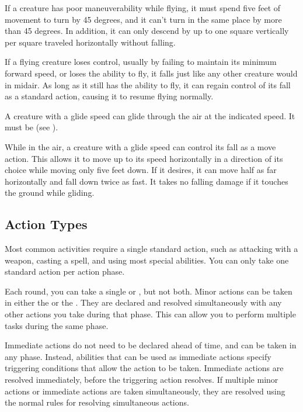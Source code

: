              If a creature has poor maneuverability while flying, it must spend five feet of movement to turn by 45 degrees, and it can't turn in the same place by more than 45 degrees. In addition, it can only descend by up to one square vertically per square traveled horizontally without falling.

             If a flying creature loses control, usually by failing to maintain its minimum forward speed, or loses the ability to fly, it falls just like any other creature would in midair. As long as it still has the ability to fly, it can regain control of its fall as a standard action, causing it to resume flying normally.

            \label{Gliding}
            A creature with a glide speed can glide through the air at the indicated speed. It must be  (see ).

            While in the air, a creature with a glide speed can control its fall as a move action. This allows it to move up to its speed horizontally in a direction of its choice while moving only five feet down. If it desires, it can move half as far horizontally and fall down twice as fast. It takes no falling damage if it touches the ground while gliding.

    \subsection{Action Types}

         Most common activities require a single standard action, such as attacking with a weapon, casting a spell, and using most special abilities.
        You can only take one standard action per action phase.

        \label{Minor and Immediate Actions} Each round, you can take a single  or , but not both.
        Minor actions can be taken in either the  or the .
        They are declared and resolved simultaneously with any other actions you take during that phase.
        This can allow you to perform multiple tasks during the same phase.

        Immediate actions do not need to be declared ahead of time, and can be taken in any phase.
        Instead, abilities that can be used as immediate actions specify triggering conditions that allow the action to be taken.
        Immediate actions are resolved immediately, before the triggering action resolves.
        If multiple minor actions or immediate actions are taken simultaneously, they are resolved using the normal rules for resolving simultaneous actions.

